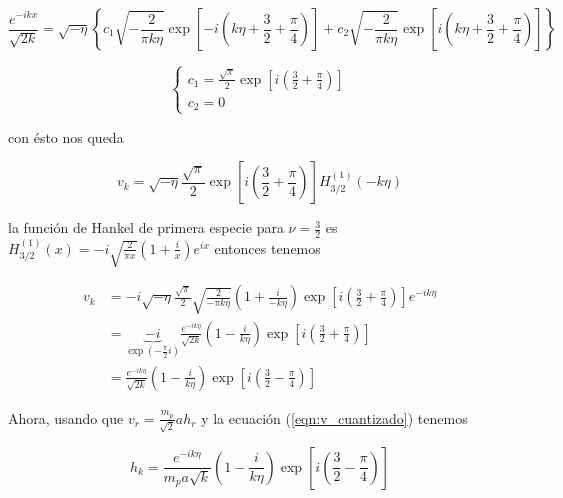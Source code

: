 \begin{equation*}
    \frac{e^{-i k x}}{\sqrt{2k}} = \sqrt{- \eta} \left\{ c_1 \sqrt{-\frac{2}{\pi k \eta}} \exp \left[ -i \left(k\eta + \frac{3}{2} + \frac{\pi}{4} \right) \right] + c_2 \sqrt{- \frac{2}{\pi k \eta}} \exp \left[ i \left(k\eta + \frac{3}{2} + \frac{\pi}{4} \right) \right] \right\}
\end{equation*}

\begin{equation}
    \begin{cases}
        \displaystyle c_1 = \frac{\sqrt{\pi}}{2} \exp \left[ i \left( \frac{3}{2} + \frac{\pi}{4} \right) \right] \\
        \displaystyle c_2 = 0
    \end{cases}
\end{equation}

\noindent
con ésto nos queda

\begin{equation}
    v_k = \sqrt{- \eta} \frac{\sqrt{\pi}}{2} \exp \left[ i \left( \frac{3}{2} + \frac{\pi}{4} \right) \right] H_{3/2}^{(1)} (- k \eta)
\end{equation}

\noindent
la función de Hankel de primera especie para $\displaystyle \nu = \frac{3}{2}$ es $\displaystyle H^{(1)}_{3/2} (x) = -i \sqrt{\frac{2}{\pi x}} \left( 1 + \frac{i}{x} \right) e^{ix}$ entonces tenemos

\begin{equation*}
    \begin{split}
        v_k &= - i\sqrt{- \eta} \frac{\sqrt{\pi}}{2} \sqrt{\frac{2}{-\pi k \eta }} \left( 1 + \frac{i}{- k \eta} \right) \exp \left[ i \left( \frac{3}{2} + \frac{\pi}{4} \right) \right] e^{-i k \eta}\\
        &= \underbrace{- i}_{\displaystyle \exp \left( -\frac{\pi}{2} i \right)} \frac{e^{- i k \eta}}{\sqrt{2k}} \left( 1 - \frac{i}{k \eta} \right) \exp \left[ i \left( \frac{3}{2} + \frac{\pi}{4} \right) \right]\\
        &= \frac{e^{- i k \eta}}{\sqrt{2 k}} \left( 1 - \frac{i}{k \eta} \right) \exp \left[ i \left( \frac{3}{2} - \frac{\pi}{4} \right) \right]
    \end{split}
\end{equation*}

Ahora, usando que $\displaystyle v_r = \frac{m_p}{\sqrt{2}} a h_r$ y la ecuación (\ref{eqn:v_cuantizado}) tenemos

\begin{equation}
    h_k = \frac{e^{- i k \eta}}{m_p a \sqrt{k}} \left( 1 - \frac{i}{k \eta} \right) \exp \left[ i \left( \frac{3}{2} - \frac{\pi}{4} \right) \right]
\end{equation}

